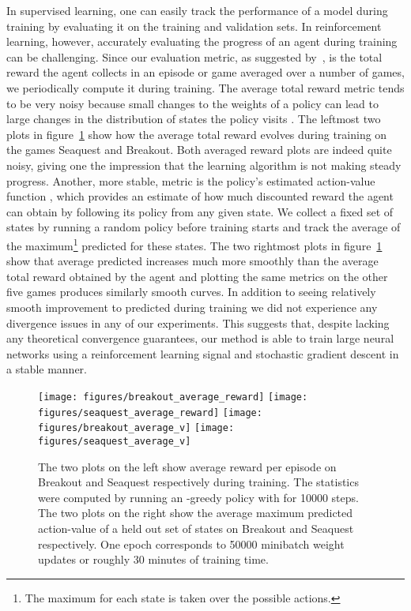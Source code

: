 \documentclass{article} \usepackage{nips13submit_e,times}
\begin{document}
In supervised learning, one can easily track the performance of a model during training by evaluating it on the training and validation sets. In reinforcement learning, however, accurately evaluating the progress of an agent during training can be challenging. 
Since our evaluation metric, as suggested by~\cite{bellemare-ale}, is the total reward the agent collects in an episode or game averaged over a number of games, we periodically compute it during training. The average total reward metric tends to be very noisy because small changes to the weights of a policy can lead to large changes in the distribution of states the policy visits .  The leftmost two plots in figure~\ref{fig-V} show how the average total reward evolves during training on the games Seaquest and Breakout.  Both averaged reward plots are indeed quite noisy, giving one the impression that the learning algorithm is not making steady progress.  Another, more stable, metric is the policy's estimated action-value function , which provides an estimate of how much discounted reward the agent can obtain by following its policy from any given state.  We collect a fixed set of states by running a random policy before training starts and track the average of the maximum\footnote{The maximum for each state is taken over the possible actions.} predicted  for these states.  The two rightmost plots in figure~\ref{fig-V} show that average predicted  increases much more smoothly than the average total reward obtained by the agent and plotting the same metrics on the other five games produces similarly smooth curves.
In addition to seeing relatively smooth improvement to predicted  during training we did not experience any divergence issues in any of our experiments.  This suggests that, despite lacking any theoretical convergence guarantees, our method is able to train large neural networks using a reinforcement learning signal and stochastic gradient descent in a stable manner.  




\begin{figure}
\texttt{[image: figures/breakout\_average\_reward]}
\texttt{[image: figures/seaquest\_average\_reward]}
\texttt{[image: figures/breakout\_average\_v]}
\texttt{[image: figures/seaquest\_average\_v]}
\caption{\label{fig-V} The two plots on the left show average reward per episode on Breakout and Seaquest respectively during training.  The statistics were computed by running an -greedy policy with  for 10000 steps. The two plots on the right show the average maximum predicted action-value of a held out set of states on Breakout and Seaquest respectively.  One epoch corresponds to 50000 minibatch weight updates or roughly 30 minutes of training time.}
\end{figure}
\end{document}
